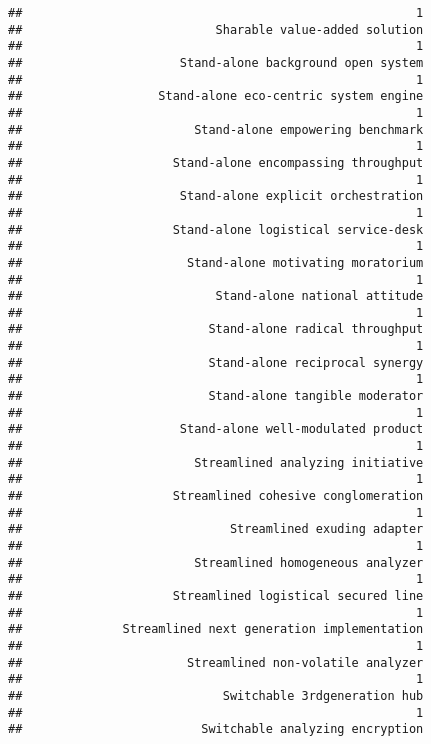 \documentclass[
]{article}
\begin{document}
\begin{verbatim}
##                                                       1 
##                           Sharable value-added solution 
##                                                       1 
##                      Stand-alone background open system 
##                                                       1 
##                   Stand-alone eco-centric system engine 
##                                                       1 
##                        Stand-alone empowering benchmark 
##                                                       1 
##                     Stand-alone encompassing throughput 
##                                                       1 
##                      Stand-alone explicit orchestration 
##                                                       1 
##                     Stand-alone logistical service-desk 
##                                                       1 
##                       Stand-alone motivating moratorium 
##                                                       1 
##                           Stand-alone national attitude 
##                                                       1 
##                          Stand-alone radical throughput 
##                                                       1 
##                          Stand-alone reciprocal synergy 
##                                                       1 
##                          Stand-alone tangible moderator 
##                                                       1 
##                      Stand-alone well-modulated product 
##                                                       1 
##                        Streamlined analyzing initiative 
##                                                       1 
##                     Streamlined cohesive conglomeration 
##                                                       1 
##                             Streamlined exuding adapter 
##                                                       1 
##                        Streamlined homogeneous analyzer 
##                                                       1 
##                     Streamlined logistical secured line 
##                                                       1 
##              Streamlined next generation implementation 
##                                                       1 
##                       Streamlined non-volatile analyzer 
##                                                       1 
##                            Switchable 3rdgeneration hub 
##                                                       1 
##                         Switchable analyzing encryption 

\end{verbatim}
\end{document}

